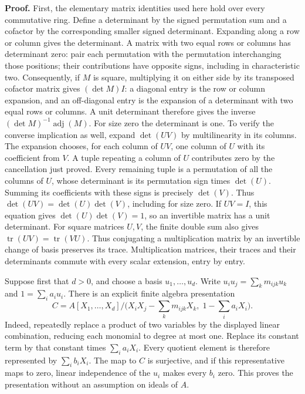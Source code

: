 \documentclass[11pt,a4paper,openany]{report}
\begin{document}
\textbf{Proof.} First, the elementary matrix identities used here hold over every commutative ring. Define a determinant by the signed permutation sum and a cofactor by the corresponding smaller signed determinant. Expanding along a row or column gives the determinant. A matrix with two equal rows or columns has determinant zero: pair each permutation with the permutation interchanging those positions; their contributions have opposite signs, including in characteristic two. Consequently, if \(M\) is square, multiplying it on either side by its transposed cofactor matrix gives \((\det M)I\): a diagonal entry is the row or column expansion, and an off-diagonal entry is the expansion of a determinant with two equal rows or columns. A unit determinant therefore gives the inverse \((\det M)^{-1}\operatorname{adj}(M)\). For size zero the determinant is one. To verify the converse implication as well, expand \(\det(UV)\) by multilinearity in its columns. The expansion chooses, for each column of \(UV\), one column of \(U\) with its coefficient from \(V\). A tuple repeating a column of \(U\) contributes zero by the cancellation just proved. Every remaining tuple is a permutation of all the columns of \(U\), whose determinant is its permutation sign times \(\det(U)\). Summing its coefficients with these signs is precisely \(\det(V)\). Thus \(\det(UV)=\det(U)\det(V)\), including for size zero. If \(UV=I\), this equation gives \(\det(U)\det(V)=1\), so an invertible matrix has a unit determinant. For square matrices \(U,V\), the finite double sum also gives \(\operatorname{tr}(UV)=\operatorname{tr}(VU)\). Thus conjugating a multiplication matrix by an invertible change of basis preserves its trace. Multiplication matrices, their traces and their determinants commute with every scalar extension, entry by entry.

Suppose first that \(d>0\), and choose a basis \(u_1,\ldots,u_d\). Write \(u_i u_j=\sum_k m_{ijk}u_k\) and \(1=\sum_i a_i u_i\). There is an explicit finite algebra presentation \[
C=A[X_1,\ldots,X_d]/\bigl(X_iX_j-\sum_k m_{ijk}X_k,\;1-\sum_i a_iX_i\bigr).
\] Indeed, repeatedly replace a product of two variables by the displayed linear combination, reducing each monomial to degree at most one. Replace its constant term by that constant times \(\sum_i a_iX_i\). Every quotient element is therefore represented by \(\sum_i b_iX_i\). The map to \(C\) is surjective, and if this representative maps to zero, linear independence of the \(u_i\) makes every \(b_i\) zero. This proves the presentation without an assumption on ideals of \(A\).
\end{document}
